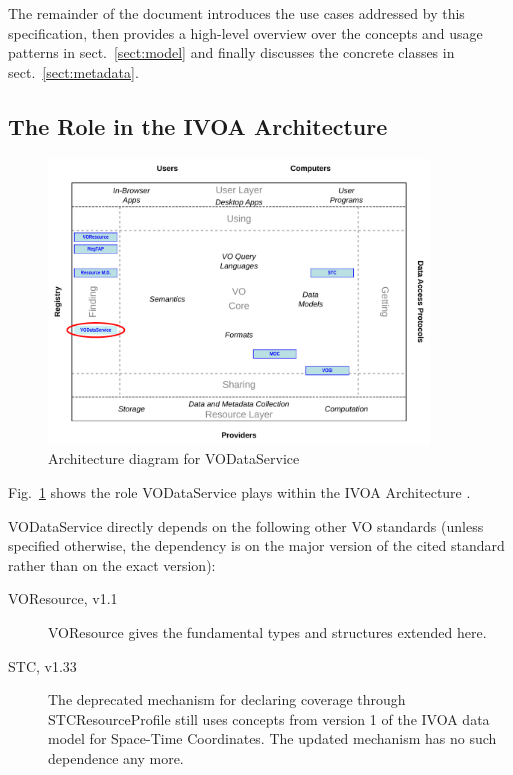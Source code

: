 \documentclass[11pt,a4paper]{ivoa}
\begin{document}
The remainder of the document introduces the use cases addressed by this
specification, then provides a high-level overview over the concepts and
usage patterns in sect.~\ref{sect:model} and finally discusses the
concrete classes in sect.~\ref{sect:metadata}.


\subsection{The Role in the IVOA Architecture}

\begin{figure}
\centering
\includegraphics[width=0.9\textwidth]{role_diagram.pdf}
\caption{Architecture diagram for VODataService}
\label{fig:archdiag}
\end{figure}

Fig.~\ref{fig:archdiag} shows the role VODataService plays within the
IVOA Architecture \citep{2010ivoa.rept.1123A}.

VODataService directly depends on the following other VO standards
(unless specified otherwise, the dependency is on the major version of
the cited standard rather than on the exact version):

\begin{description}
\item[VOResource, v1.1 \citep{2018ivoa.spec.0625P}] VOResource gives
the fundamental types and structures extended here.
\item[STC, v1.33 \citep{2007ivoa.spec.1030R}] The deprecated mechanism
for declaring coverage through STCResourceProfile still uses concepts
from version 1 of the IVOA data model for Space-Time Coordinates.  The
updated mechanism has no such dependence any more.
\end{description}
\end{document}
